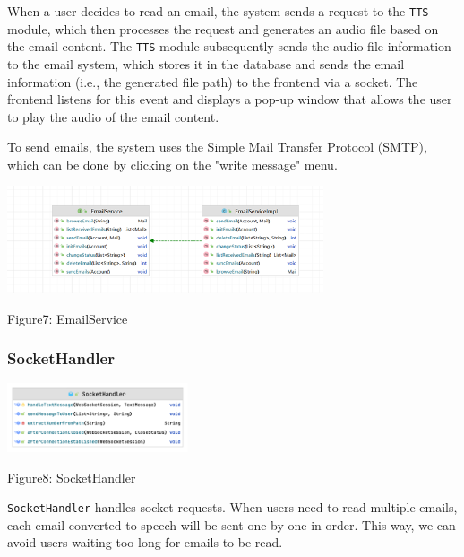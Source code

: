 \documentclass{article}
\begin{document}
When a user decides to read an email, the system sends a request to the \texttt{TTS} module, which then processes the request and generates an audio file based on the email content. The \texttt{TTS} module subsequently sends the audio file information to the email system, which stores it in the database and sends the email information (i.e., the generated file path) to the frontend via a socket. The frontend listens for this event and displays a pop-up window that allows the user to play the audio of the email content.

To send emails, the system uses the Simple Mail Transfer Protocol (SMTP), which can be done by clicking on the "write message" menu.\\
\begin{center}
\includegraphics[width=0.7\textwidth]{EmailService.png}
\end{center}
\begin{center}
Figure7: EmailService
\end{center}

\subsubsection{SocketHandler}
\begin{center}
\includegraphics[width=0.4\textwidth]{SocketHandler.png}
\end{center}
\begin{center}
Figure8: SocketHandler
\end{center}
\texttt{SocketHandler} handles socket requests. When users need to read multiple emails, each email converted to speech will be sent one by one in order. This way, we can avoid users waiting too long for emails to be read.
\end{document}
